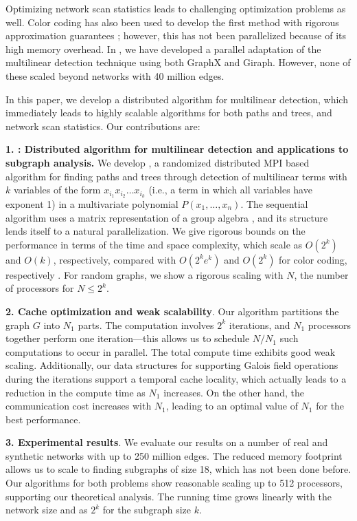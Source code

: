 Optimizing network scan statistics leads to challenging optimization problems as well.
Color coding has also been used to develop the first method with rigorous approximation
guarantees \cite{cadena:sdm17}; however, this has not been parallelized because of
its high memory overhead. In \cite{cadena:bigdata17}, we have developed a
parallel adaptation of the multilinear detection technique using both GraphX and Giraph. However,
none of these scaled beyond networks with 40 million edges.

In this paper, we develop a distributed algorithm for multilinear detection,
which immediately leads to highly scalable algorithms for both paths and trees,
and network scan statistics.
Our contributions are:

\noindent
\textbf{1. \ouralgo{}: Distributed algorithm for multilinear detection
and applications to subgraph analysis.}
We develop \ouralgo{}, a randomized distributed MPI based algorithm for finding
paths and trees through detection of
multilinear terms with $k$ variables of the form $x_{i_1}x_{i_2}\ldots x_{i_k}$ (i.e., a term in
which all variables have exponent 1) in a multivariate polynomial
$P(x_1,\ldots,x_n)$. The sequential algorithm uses a matrix representation
of a group algebra \cite{koutis:icalp08, williams2009finding}, and its structure lends itself to a natural
parallelization.  We give rigorous bounds on the performance in terms of the time and
space complexity, which scale as
$O(2^k)$ and $O(k)$, respectively, compared with $O(2^ke^k)$ and $O(2^k)$ for
color coding, respectively \cite{zhao2012sahad, slota:icpp13, slota:ipdps14}.
For random graphs, we show a rigorous scaling with $N$, the number of processors for $N\leq 2^k$.

\noindent
\textbf{2. Cache optimization and weak scalability}. %
Our algorithm partitions the graph $G$ into $N_1$ parts. The computation involves $2^k$
iterations, and $N_1$ processors together perform one iteration---this allows us to schedule
$N/N_1$ such computations to occur in parallel. The total compute time exhibits good weak scaling.
Additionally, our data structures for supporting Galois field operations
during the iterations support a temporal cache locality, which actually leads to a reduction
in the compute time as $N_1$ increases. On the other hand, the communication cost increases
with $N_1$, leading to an optimal value of $N_1$ for the best performance.


\noindent
\textbf{3. Experimental results}. We evaluate our results on a number of real and synthetic networks with up to 250 million edges. The reduced memory footprint allows us to scale to finding subgraphs of size 18, which has not been done before.  Our algorithms for
both problems show reasonable scaling up to 512 processors, supporting our theoretical analysis. 
The running time grows linearly with the network size and as $2^k$ for the subgraph size $k$.

